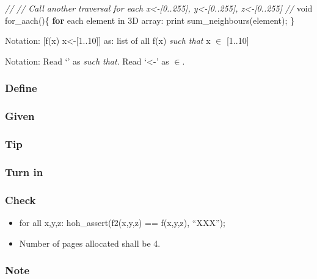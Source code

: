 \documentclass[]{book}
\newenvironment{Shaded}{}{}
\newcommand{\KeywordTok}[1]{\textbf{{#1}}}
\newcommand{\DataTypeTok}[1]{\textcolor[rgb]{0.50,0.00,0.00}{{#1}}}
\newcommand{\CommentTok}[1]{\textcolor[rgb]{0.50,0.50,0.50}{\textit{{#1}}}}
\newcommand{\NormalTok}[1]{{#1}}
\begin{document}
\begin{Shaded}
\begin{Highlighting}[]
        \CommentTok{//}
        \CommentTok{// Call another traversal for each x<-[0..255], y<-[0..255], z<-[0..255]}
        \CommentTok{//}
        \DataTypeTok{void} \NormalTok{for_aach()\{}
          \KeywordTok{for} \NormalTok{each element in 3D array: }
             \NormalTok{print sum_neighbours(element);}
        \NormalTok{\}}
\end{Highlighting}
\end{Shaded}

Notation: {[}f(x) \textbar{} x\textless{}-{[}1..10{]}{]} as: list of all
f(x) \emph{such that} x \(\in\) {[}1..10{]}

Notation: Read `\textbar{}' as \emph{such that}. Read `\textless{}-' as
\(\in\).

\subsubsection*{Define}\label{define-13}

\subsubsection*{Given}\label{given-13}

\subsubsection*{Tip}\label{tip-13}

\subsubsection*{Turn in}\label{turn-in-13}

\subsubsection*{Check}\label{check-13}

\begin{itemize}
\itemsep1pt\parskip0pt
\item
  for all x,y,z: hoh\_assert(f2(x,y,z) == f(x,y,z), ``XXX'');
\item
  Number of pages allocated shall be 4.
\end{itemize}

\subsubsection*{Note}\label{note-15}
\end{document}

